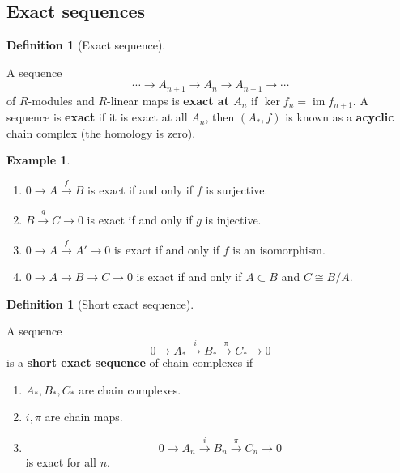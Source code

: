 \documentclass[10pt,]{book}
\newcommand{\terminology}[1]{\textbf{#1}}
\theoremstyle{plain}
\theoremstyle{definition}
\newtheorem{definition}[theorem]{Definition}
\newtheorem{example}[theorem]{Example}
\numberwithin{equation}{section}
\DeclareMathOperator{\im}{im}
\begin{document}
\subsection[Exact sequences]{Exact sequences}\label{subsection-6}
\begin{definition}[Exact sequence]\label{definition-12}

              A sequence
              \[
                \cdots \to A_{n+1} \to A_n \to A_{n-1} \to \cdots
              \]
              of \(R\)-modules and \(R\)-linear maps is \terminology{exact at \(A_n\)} if \(\ker f_n = \im f_{n+1}\).
              \newline{}
              A sequence is \terminology{exact} if it is exact at all \(A_n\), then \((A_*,f)\) is known as a \terminology{acyclic} chain complex (the homology is zero).
            \end{definition}
\begin{example}\label{example-7}
\begin{enumerate}
\item{}
                \(0 \to A \xrightarrow{f} B\) is exact if and only if \(f\) is surjective.
              \item{}
                \(B \xrightarrow{g} C \to 0\) is exact if and only if \(g\) is injective.
              \item{}
                \(0 \to A \xrightarrow{f} A' \to 0\) is exact if and only if \(f\) is an isomorphism.
              \item{}
                \(0 \to A \to B \to C \to 0\) is exact if and only if \(A\subset B\) and \(C\cong B/A\).
              \end{enumerate}
\end{example}
\begin{definition}[Short exact sequence]\label{definition-13}

              A sequence 
              \[
                0 \to A_* \xrightarrow i B_* \xrightarrow{\pi} C_* \to 0
              \]
              is a \terminology{short exact sequence} of chain complexes if
              \begin{enumerate}
\item{}
                  \(A_*,B_*,C_*\) are chain complexes.
                \item{}
                  \(i, \pi\) are chain maps.
                \item{}
                  \[
                    0 \to A_n \xrightarrow i B_n \xrightarrow{\pi} C_n \to 0
                  \]
                  is exact for all \(n\).
                \end{enumerate}
\end{definition}
\end{document}
